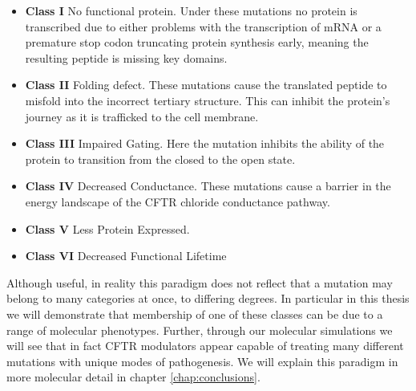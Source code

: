 \begin{itemize}
	\item \textbf{Class I} No functional protein. Under these mutations no protein is transcribed due to either problems with the transcription of mRNA or a premature stop codon truncating protein synthesis early, meaning the resulting peptide is missing key domains. 
	\item \textbf{Class II} Folding defect. These mutations cause the translated peptide to misfold into the incorrect tertiary structure. This can inhibit the protein's journey as it is trafficked to the cell membrane. 
	\item \textbf{Class III} Impaired Gating. Here the mutation inhibits the ability of the protein to transition from the closed to the open state. 
	\item \textbf{Class IV} Decreased Conductance. These mutations cause a barrier in the energy landscape of the CFTR chloride conductance pathway.
	\item \textbf{Class V} Less Protein Expressed.  
	\item \textbf{Class VI} Decreased Functional Lifetime

\end{itemize}

Although useful, in reality this paradigm does not reflect that a mutation may belong to many categories at once, to differing degrees. In particular in this thesis we will demonstrate that membership of one of these classes can be due to a range of molecular phenotypes. Further, through our molecular simulations we will see that in fact CFTR modulators appear capable of treating many different mutations with unique modes of pathogenesis. We will explain this paradigm in more molecular detail in chapter \ref{chap:conclusions}.


